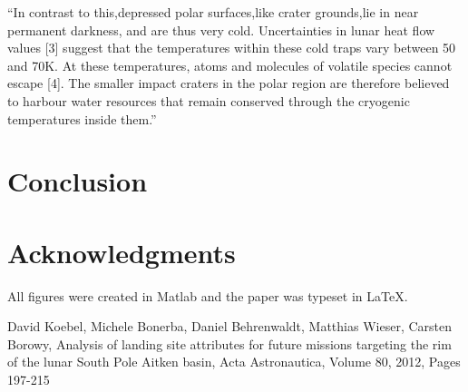 \documentclass[prl,twocolumn]{revtex4-1}  %
\begin{document}
``In contrast to this,depressed polar surfaces,like crater grounds,lie in near permanent darkness, and are thus very cold. Uncertainties in lunar heat flow values [3] suggest that the temperatures within these cold traps vary between 50 and 70K. At these temperatures, atoms and molecules of volatile species cannot escape [4]. The smaller impact
craters in the polar region are therefore believed to harbour
water resources that remain conserved through the cryogenic temperatures inside them.''\citep{Koebel}


\section{Conclusion}

\appendix*   %


\section{ Acknowledgments}

 All figures were created in Matlab and the paper was typeset in \LaTeX.
\begin{acknowledgments}


\end{acknowledgments}

\begin{thebibliography}{99}

David Koebel, Michele Bonerba, Daniel Behrenwaldt, Matthias Wieser, Carsten Borowy,
Analysis of landing site attributes for future missions targeting the rim of the lunar South Pole Aitken basin,
Acta Astronautica,
Volume 80,
2012,
Pages 197-215



\end{thebibliography}
\end{document}
